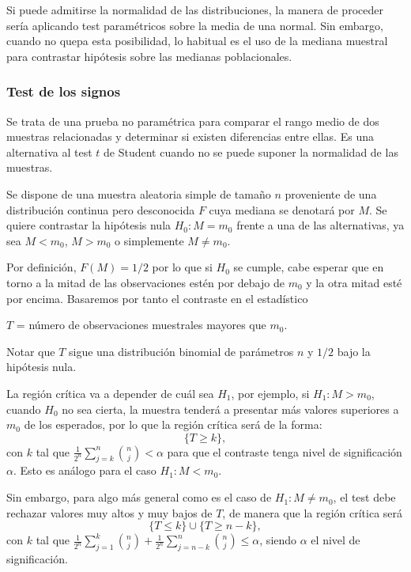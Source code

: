 \documentclass[a4paper,12pt]{article}
\begin{document}
Si puede admitirse la normalidad de las distribuciones, la manera de proceder sería aplicando test paramétricos sobre la media de una normal. Sin embargo, cuando no quepa esta posibilidad, lo habitual es el uso de la mediana muestral para contrastar hipótesis sobre las medianas poblacionales.

\subsubsection{Test de los signos}
Se trata de una prueba no paramétrica para comparar el rango medio de dos muestras relacionadas y determinar si existen diferencias entre ellas. Es una alternativa al test $t$ de Student cuando no se puede suponer la normalidad de las muestras.

Se dispone de una muestra aleatoria simple de tamaño $n$ proveniente de una distribución continua pero desconocida $F$ cuya mediana se denotará por $M$. Se quiere contrastar la hipótesis nula $H_0: M=m_0$ frente a una de las alternativas, ya sea $M<m_0$, $M>m_0$ o simplemente $M\neq m_0$.

Por definición, $F(M)=1/2$ por lo que si $H_0$ se cumple, cabe esperar que en torno a la mitad de las observaciones estén por debajo de $m_0$ y la otra mitad esté por encima. Basaremos por tanto el contraste en el estadístico

\begin{center}
$T$ = número de observaciones muestrales mayores que $m_0$.
\end{center}

Notar que $T$ sigue una distribución binomial de parámetros $n$ y $1/2$ bajo la hipótesis nula.

La región crítica va a depender de cuál sea $H_1$, por ejemplo, si $H_1:M>m_0$, cuando $H_0$ no sea cierta, la muestra tenderá a presentar más valores superiores a $m_0$ de los esperados, por lo que la región crítica será de la forma:
$$\{T\geq k \},$$
con $k$ tal que $\frac{1}{2^n}\sum_{j=k}^{n} \binom{n}{j} < \alpha$ para que el contraste tenga nivel de significación $\alpha$. Esto es análogo para el caso $H_1: M< m_0$.

Sin embargo, para algo más general como es el caso de $H_1:M\neq m_0$, el test debe rechazar valores muy altos y muy bajos de $T$, de manera que la región crítica será 
    $$\{T\leq k\}\cup \{T\geq n - k \},$$
con $k$ tal que $\frac{1}{2^n}\sum_{j=1}^{k} \binom{n}{j} + \frac{1}{2^n}\sum_{j=n-k}^{n} \binom{n}{j} \leq \alpha$, siendo $\alpha$ el nivel de significación.
\end{document}
